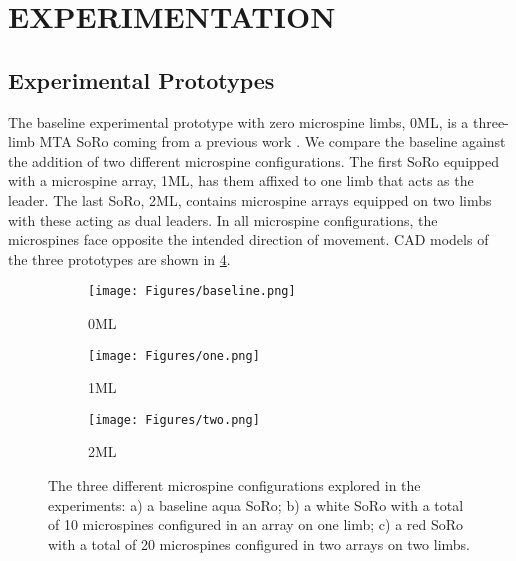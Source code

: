 \section{EXPERIMENTATION}

\subsection{Experimental Prototypes}
The baseline experimental prototype with zero microspine limbs, 0ML, is a three-limb MTA SoRo coming from a previous work \cite{freeman2024environmentcentriclearningapproachgait}. We compare the baseline against the addition of two different microspine configurations. The first SoRo equipped with a microspine array, 1ML, has them affixed to one limb that acts as the leader. The last SoRo, 2ML, contains microspine arrays equipped on two limbs with these acting as dual leaders. In all microspine configurations, the microspines face opposite the intended direction of movement. CAD models of the three prototypes are shown in \Fig \ref{fig:SoRos}.

\begin{figure}[h]
    \centering
    \begin{subfigure}{0.32\linewidth}
         \centering
         \texttt{[image: Figures/baseline.png]}
         \caption{0ML}
         \label{fig:base}
     \end{subfigure}
     \begin{subfigure}{0.32\linewidth}
         \centering
         \texttt{[image: Figures/one.png]}
         \caption{1ML}
         \label{fig:one}
     \end{subfigure}
     \begin{subfigure}{0.32\linewidth}
         \centering
         \texttt{[image: Figures/two.png]}
         \caption{2ML}
         \label{fig:two}
     \end{subfigure}
    \caption{The three different microspine configurations explored in the experiments: a) a baseline aqua SoRo; b) a white SoRo with a total of 10 microspines configured in an array on one limb; c) a red SoRo with a total of 20 microspines configured in two arrays on two limbs.}
    \label{fig:SoRos}
\end{figure}



